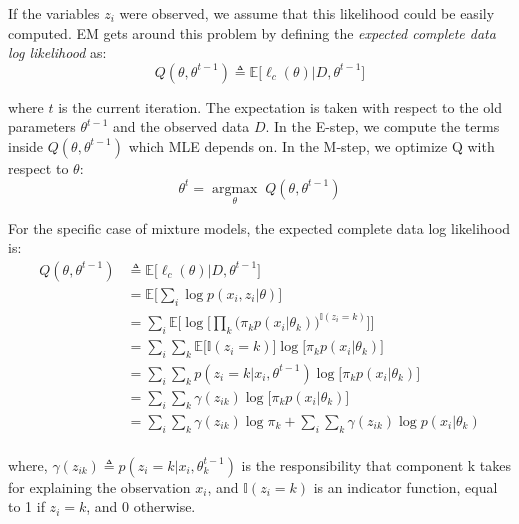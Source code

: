 If the variables $z_{i}$ were observed, we assume that this likelihood could be easily computed. EM gets around this problem by defining the \emph{expected complete data log likelihood} as:
\begin{equation} \label{log-lik-expected-f}
		Q(\theta, \theta^{t-1}) \triangleq \mathbb{E} \big[\ell_{c}(\theta) | D, \theta^{t-1}\big]
\end{equation}

where $t$ is the current iteration. The expectation is taken with respect to the old parameters $\theta^{t-1}$ and the observed data $D$. In the E-step, we compute the terms inside $Q(\theta, \theta^{t-1})$ which MLE depends on. In the M-step, we optimize Q with respect to $\theta$:
\begin{equation} \label{log-lik-observed-f}
	\theta^{t} = \underset{\theta}{\operatorname{argmax}} \; Q(\theta, \theta^{t-1})
\end{equation}

For the specific case of mixture models, the expected complete data log likelihood is:
\begin{equation} \label{log-lik-expected-f}
	\begin{split}
		Q(\theta, \theta^{t-1}) & \triangleq \mathbb{E} \big[\ell_{c}(\theta) | D, \theta^{t-1}\big] \\
								& = \mathbb{E} \bigg[ \sum_{i} \log p(x_{i}, z_{i}|\theta) \bigg] \\
								& = \sum_{i} \mathbb{E} \bigg[ \log \bigg[\prod_{k} \big( \pi_{k}p(x_{i}|\theta_{k})\big)^{\mathbb{I}(z_{i}=k)} \bigg]\bigg] \\
								& = \sum_{i} \sum_{k} \mathbb{E} \big[\mathbb{I}(z_{i}=k)\big] \log \big[\pi_{k}p(x_{i}|\theta_{k})\big] \\
								& = \sum_{i} \sum_{k} p(z_{i}=k|x_{i},\theta^{t-1}) \log \big[\pi_{k}p(x_{i}|\theta_{k})\big] \\
								& = \sum_{i} \sum_{k} \gamma(z_{ik}) \log \big[\pi_{k}p(x_{i}|\theta_{k})\big] \\
								& = \sum_{i} \sum_{k} \gamma(z_{ik}) \log \pi_{k} + \sum_{i} \sum_{k} \gamma(z_{ik}) \log p(x_{i}|\theta_{k}) \\		
	\end{split}
\end{equation}

where, $\gamma(z_{ik}) \triangleq p(z_{i}=k|x_{i},\theta_{k}^{t-1})$ is the responsibility that component k takes for explaining the observation $x_{i}$, and $\mathbb{I}(z_{i}=k)$ is an indicator function, equal to 1 if $z_{i}=k$, and 0 otherwise.

